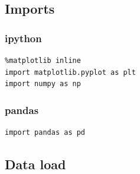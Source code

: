 \documentclass[11pt]{article}
\begin{document}
\subsection{Imports}
\label{sec:orgaa834e0}
\subsubsection{ipython}
\label{sec:org99b95eb}
\begin{verbatim}
%matplotlib inline
import matplotlib.pyplot as plt
import numpy as np
\end{verbatim}
\subsubsection{pandas}
\label{sec:org6aae676}
\begin{verbatim}
import pandas as pd    
\end{verbatim}

\subsection{Data load}
\label{sec:orge893e56}
\end{document}
